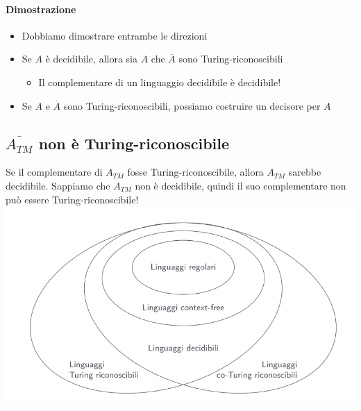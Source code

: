 \paragraph{Dimostrazione}
\begin{itemize}
	\item Dobbiamo dimostrare entrambe le direzioni 
	\item Se $A$ è decidibile, allora sia $A$ che $\overline{A}$ sono Turing-riconoscibili
		\begin{itemize}
			\item Il complementare di un linguaggio decidibile è decidibile! \end{itemize}
	\item Se $A$ e $\overline{A}$ sono Turing-riconoscibili, possiamo costruire un decisore per $A$ 
\end{itemize}

\subsection{$\overline{A_{TM}}$ non è Turing-riconoscibile}
Se il complementare di $A_{TM}$ fosse Turing-riconoscibile, allora $A_{TM}$ sarebbe decidibile.
Sappiamo che $A_{TM}$ non è decidibile, quindi il suo complementare non può essere Turing-riconoscibile! 
\includegraphics[scale=0.5]{img/linguaggi_diagramma.png}
